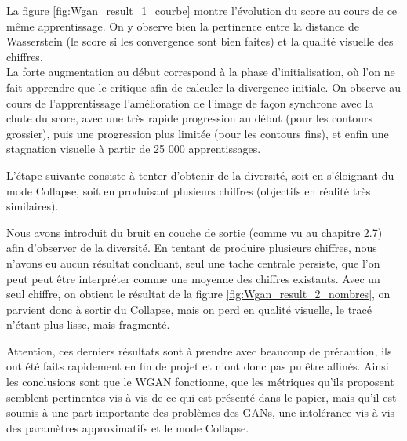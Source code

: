 	La figure \ref{fig:Wgan_result_1_courbe} montre l'évolution du score au cours de ce même apprentissage. On y observe bien la pertinence entre la distance de Wasserstein (le score si les convergence sont bien faites) et la qualité visuelle des chiffres. \\
	La forte augmentation au début correspond à la phase d'initialisation, où l'on ne fait apprendre que le critique afin de calculer la divergence initiale. On observe au cours de l'apprentissage l'amélioration de l'image de façon synchrone avec la chute du score, avec une très rapide progression au début (pour les contours grossier), puis une progression plus limitée (pour les contours fins), et enfin une stagnation visuelle à partir de 25 000 apprentissages.

	L'étape suivante consiste à tenter d'obtenir de la diversité, soit en s’éloignant du mode Collapse, soit en produisant plusieurs chiffres (objectifs en réalité très similaires). 

	Nous avons introduit du bruit en couche de sortie (comme vu au chapitre 2.7) afin d'observer de la diversité. En tentant de produire plusieurs chiffres, nous n'avons eu aucun résultat concluant, seul une tache centrale persiste, que l'on peut peut être interpréter comme une moyenne des chiffres existants. Avec un seul chiffre, on obtient le résultat de la figure \ref{fig:Wgan_result_2_nombres}, on parvient donc à sortir du Collapse, mais on perd en qualité visuelle, le tracé n'étant plus lisse, mais fragmenté.

	Attention, ces derniers résultats sont à prendre avec beaucoup de précaution, ils ont été faits rapidement en fin de projet et n'ont donc pas pu être affinés. Ainsi les conclusions sont que le WGAN fonctionne, que les métriques qu'ils proposent semblent pertinentes vis à vis de ce qui est présenté dans le papier, mais qu'il est soumis à une part importante des problèmes des GANs, une intolérance vis à vis des paramètres approximatifs et le mode Collapse.

